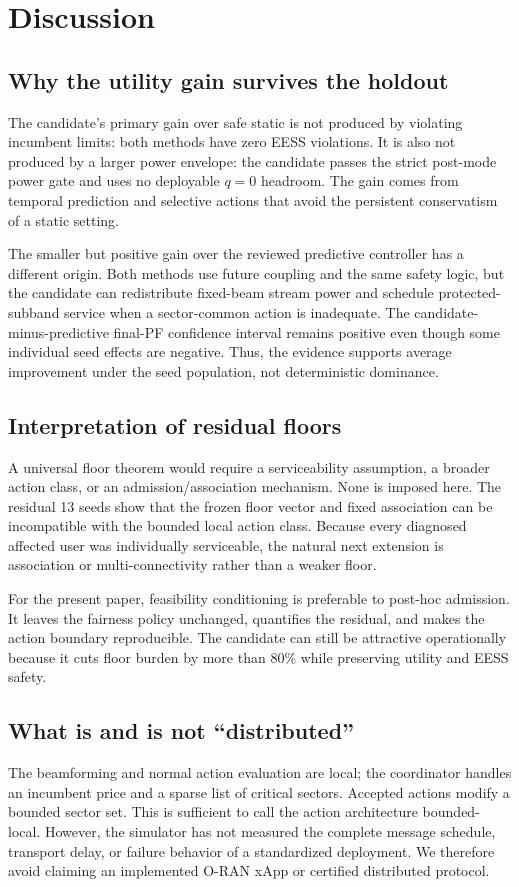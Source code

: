 \documentclass[journal]{IEEEtran}
\begin{document}
\section{Discussion}
\subsection{Why the utility gain survives the holdout}
The candidate's primary gain over safe static is not produced by violating incumbent limits: both methods have zero EESS violations. It is also not produced by a larger power envelope: the candidate passes the strict post-mode power gate and uses no deployable $q=0$ headroom. The gain comes from temporal prediction and selective actions that avoid the persistent conservatism of a static setting.

The smaller but positive gain over the reviewed predictive controller has a different origin. Both methods use future coupling and the same safety logic, but the candidate can redistribute fixed-beam stream power and schedule protected-subband service when a sector-common action is inadequate. The candidate-minus-predictive final-PF confidence interval remains positive even though some individual seed effects are negative. Thus, the evidence supports average improvement under the seed population, not deterministic dominance.

\subsection{Interpretation of residual floors}
A universal floor theorem would require a serviceability assumption, a broader action class, or an admission/association mechanism. None is imposed here. The residual 13 seeds show that the frozen floor vector and fixed association can be incompatible with the bounded local action class. Because every diagnosed affected user was individually serviceable, the natural next extension is association or multi-connectivity rather than a weaker floor.

For the present paper, feasibility conditioning is preferable to post-hoc admission. It leaves the fairness policy unchanged, quantifies the residual, and makes the action boundary reproducible. The candidate can still be attractive operationally because it cuts floor burden by more than 80\% while preserving utility and EESS safety.

\subsection{What is and is not ``distributed''}
The beamforming and normal action evaluation are local; the coordinator handles an incumbent price and a sparse list of critical sectors. Accepted actions modify a bounded sector set. This is sufficient to call the action architecture bounded-local. However, the simulator has not measured the complete message schedule, transport delay, or failure behavior of a standardized deployment. We therefore avoid claiming an implemented O-RAN xApp or certified distributed protocol.
\end{document}
